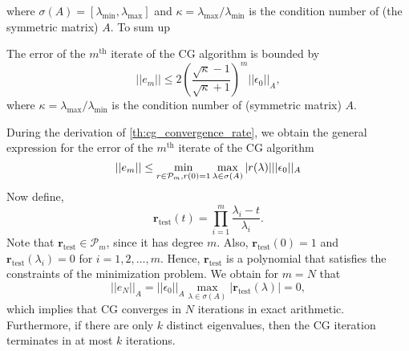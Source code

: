 where $\sigma(A) = [\lambda_{\text{min}}, \lambda_{\text{max}}]$ and $\kappa = \lambda_{\text{max}}/\lambda_{\text{min}}$ is the condition number of (the symmetric matrix) $A$. To sum up
\begin{theorem}
  The error of the $m^{\text{th}}$ iterate of the CG algorithm is bounded by
  \begin{equation}
    ||e_m|| \leq 2 \left(\frac{\sqrt{\kappa}-1}{\sqrt{\kappa} + 1}\right)^m ||\epsilon_0||_A,
    \label{eq:cg_convergence_rate_bound}
  \end{equation}
  where $\kappa = \lambda_{\text{max}}/\lambda_{\text{min}}$ is the condition number of (symmetric matrix) $A$.
  \label{th:cg_convergence_rate_bound}
\end{theorem}
During the derivation of \cref{th:cg_convergence_rate}, we obtain the general expression for the error of the $m^{\text{th}}$ iterate of the CG algorithm
\[
  || e_m|| \leq \min_{r \in \mathcal{P}_{m}, r(0) = 1} \max_{\lambda \in \sigma(A)} |r(\lambda)| ||\epsilon_0||_A \\
\]
Now define,
\[
  \mathbf{r}_{\textrm{test}}(t) = \prod_{i=1}^m \frac{\lambda_i - t}{\lambda_i}.
\]
Note that $\mathbf{r}_{\textrm{test}}\in\mathcal{P}_m$, since it has degree $m$. Also, $\mathbf{r}_{\textrm{test}}(0) = 1$ and $\mathbf{r}_{\textrm{test}}(\lambda_i) = 0$ for $i = 1, 2, \dots, m$. Hence, $\mathbf{r}_{\textrm{test}}$ is a polynomial that satisfies the constraints of the minimization problem. We obtain for $m = N$ that
\[
  ||e_N||_A = ||\epsilon_0||_A \max_{\lambda \in \sigma(A)} |\mathbf{r}_{\textrm{test}}(\lambda)| = 0,
\]
which implies that CG converges in $N$ iterations in exact arithmetic. Furthermore, if there are only $k$ distinct eigenvalues, then the CG iteration terminates in at most $k$ iterations.

